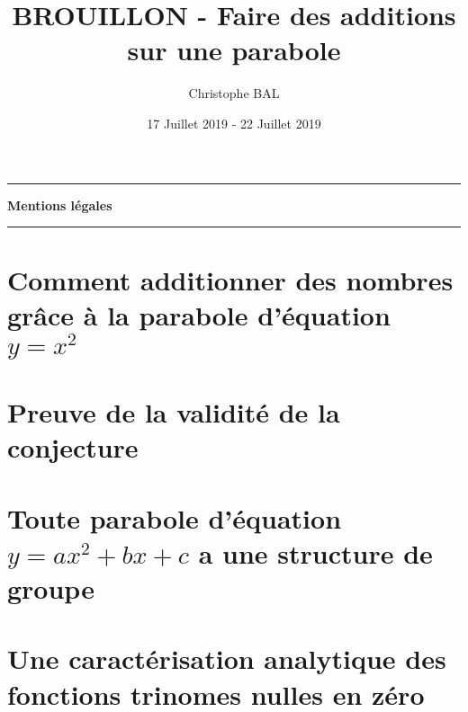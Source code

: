 \documentclass[12pt]{amsart}
\begin{document}
\title{BROUILLON - Faire des additions sur une parabole}
\author{Christophe BAL}
\date{17 Juillet 2019 - 22 Juillet 2019}
\maketitle


\vspace{-.9em}


\begin{center}
	\hrule\vspace{.3em}
	{
		\fontsize{1.35em}{1em}\selectfont
		\textbf{Mentions \og légales \fg}
	}
			
	\vspace{0.45em}
	\doclicenseThis
	\hrule
\end{center}



\setcounter{tocdepth}{2}
\tableofcontents



\section{\texorpdfstring{Comment additionner des nombres grâce à la parabole d'équation $y = x^2$}%
                        {Comment additionner des nombres grâce à la parabole d'équation y = x**2}}





\section{Preuve de la validité de la conjecture} \label{proof}
\label{proof}





\section{\texorpdfstring{Toute parabole d'équation $y = a x^2 + b x + c$ a une structure de groupe}%
                        {Toute parabole d'équation y = a x**2 + b x + c a une structure de groupe}}
      




\section{Une caractérisation analytique des fonctions trinomes nulles en zéro}
      

\end{document}
